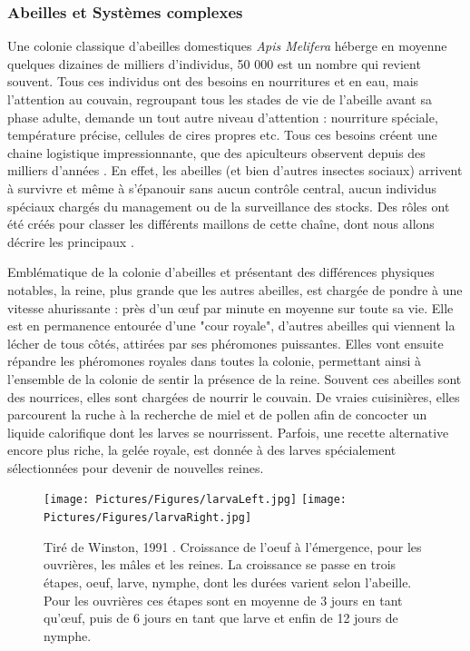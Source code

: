 			

	
		\subsubsection{Abeilles et Systèmes complexes}		
			Une colonie classique d'abeilles domestiques \textit{Apis Melifera} héberge en moyenne quelques dizaines de milliers d'individus, 50 000 est un nombre qui revient souvent. Tous ces individus ont des besoins en nourritures et en eau, mais l'attention au couvain, regroupant tous les stades de vie de l'abeille avant sa phase adulte, demande un tout autre niveau d'attention : nourriture spéciale, température précise, cellules de cires propres etc. Tous ces besoins créent une chaine logistique impressionnante, que des apiculteurs observent depuis des milliers d'années \cite{oldroyd_domestication_2012}. En effet, les abeilles (et bien d'autres insectes sociaux) arrivent à survivre et même à s'épanouir sans aucun contrôle central, aucun individus spéciaux chargés du management ou de la surveillance des stocks. Des rôles ont été créés pour classer les différents maillons de cette chaîne, dont nous allons décrire les principaux \cite{winston_biology_1991, winston_role_1991, seeley_age_1991}. 
			
			Emblématique de la colonie d'abeilles et présentant des différences physiques notables, la reine, plus grande que les autres abeilles, est chargée de pondre à une vitesse ahurissante : près d'un œuf par minute en moyenne sur toute sa vie. Elle est en permanence entourée d'une "cour royale", d'autres abeilles qui viennent la lécher de tous côtés, attirées par ses phéromones puissantes. Elles vont ensuite répandre les phéromones royales dans toutes la colonie, permettant ainsi à l'ensemble de la colonie de sentir la présence de la reine. Souvent ces abeilles sont des nourrices, elles sont chargées de nourrir le couvain. De vraies cuisinières, elles parcourent la ruche à la recherche de miel et de pollen afin de concocter un liquide calorifique dont les larves se nourrissent. Parfois, une recette alternative encore plus riche, la gelée royale, est donnée à des larves spécialement sélectionnées pour devenir de nouvelles reines.
			
			\begin{figure}
			\centering
			\texttt{[image: Pictures/Figures/larvaLeft.jpg]}
			\texttt{[image: Pictures/Figures/larvaRight.jpg]}
			\caption{Tiré de Winston, 1991 \cite{winston_biology_1991}. Croissance de l'oeuf à l'émergence, pour les ouvrières, les mâles et les reines. La croissance se passe en trois étapes, oeuf, larve, nymphe, dont les durées varient selon l'abeille. Pour les ouvrières ces étapes sont en moyenne de 3 jours en tant qu'œuf, puis de 6 jours en tant que larve et enfin de 12 jours de nymphe.}
			\label{LarvaDev}
			\end{figure}
			
